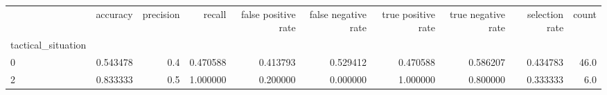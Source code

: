 \begin{tabular}{lrrrrrrrrr}
\toprule
{} &  accuracy &  precision &    recall &  false positive rate &  false negative rate &  true positive rate &  true negative rate &  selection rate &  count \\
tactical\_situation &           &            &           &                      &                      &                     &                     &                 &        \\
\midrule
0                  &  0.543478 &        0.4 &  0.470588 &             0.413793 &             0.529412 &            0.470588 &            0.586207 &        0.434783 &   46.0 \\
2                  &  0.833333 &        0.5 &  1.000000 &             0.200000 &             0.000000 &            1.000000 &            0.800000 &        0.333333 &    6.0 \\
\bottomrule
\end{tabular}
